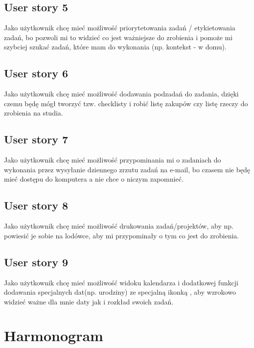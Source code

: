 \documentclass[a4paper]{article}
\begin{document}
\subsection{User story 5}
\label{subsec:UserStory5}

Jako użytkownik chcę mieć możliwość priorytetowania zadań / etykietowania zadań, bo pozwoli mi to widzieć co jest ważniejsze do zrobienia i pomoże mi szybciej szukać zadań, które mam do wykonania (np. kontekst - w domu).

\subsection{User story 6}
\label{subsec:UserStory6}

Jako użytkownik chcę mieć możliwość dodawania podzadań do zadania, dzięki czemu będę mógł tworzyć tzw. checklisty i robić listę zakupów czy listę rzeczy do zrobienia na studia.

\subsection{User story 7}
\label{subsec:UserStory7}

Jako użytkownik chcę mieć możliwość przypominania mi o zadaniach do wykonania  przez wysyłanie dziennego zrzutu zadań na e-mail, bo czasem nie będę mieć dostępu do komputera a nie chce o niczym zapomnieć.

\subsection{User story 8}
\label{subsec:UserStory8}

Jako użytkownik chcę mieć możliwość drukowania zadań/projektów, aby np. powiesić je sobie na lodówce, aby mi przypominały o tym co jest do zrobienia.

\subsection{User story 9}
\label{subsec:UserStory9}

Jako użytkownik chcę mieć możliwość widoku kalendarza i dodatkowej funkcji dodawania specjalnych dat(np. urodziny) ze specjalną ikonką , aby wzrokowo widzieć ważne dla mnie daty jak i rozkład swoich zadań.



\section{Harmonogram}
\label{sec:Harmonogram}
\end{document}
